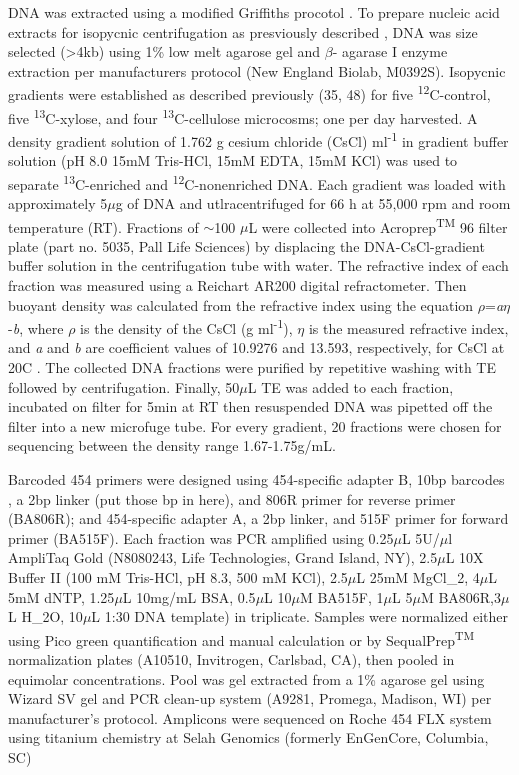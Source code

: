 DNA was extracted using a modified Griffiths procotol \cite{Griffiths_2000}. To prepare nucleic acid extracts for isopycnic centrifugation as presviously described \cite{Buckley_2007}, DNA was size selected (>4kb) using 1\% low melt agarose gel and $\beta$- agarase I enzyme extraction per manufacturers protocol (New England Biolab, M0392S). Isopycnic gradients were established as described previously (35, 48) for five \textsuperscript{12}C-control, five \textsuperscript{13}C-xylose, and four \textsuperscript{13}C-cellulose microcosms; one per day harvested. A density gradient solution of 1.762 g cesium chloride (CsCl) ml\textsuperscript{-1} in gradient buffer solution (pH 8.0 15mM Tris-HCl, 15mM EDTA, 15mM KCl) was used to separate \textsuperscript{13}C-enriched and \textsuperscript{12}C-nonenriched DNA. Each gradient was loaded with approximately 5$\mu$g of DNA and utlracentrifuged for 66 h at 55,000 rpm and room temperature (RT). Fractions of $\sim$100 $\mu$L were collected into Acroprep\textsuperscript{TM} 96 filter plate (part no. 5035, Pall Life Sciences) by displacing the DNA-CsCl-gradient buffer solution in the centrifugation tube with water. The refractive index of each fraction was measured using a Reichart AR200 digital refractometer. Then buoyant density was calculated from the refractive index using the equation $\rho$=\textit{a}$\eta$-\textit{b}, where $\rho$ is the density of the CsCl (g ml\textsuperscript{-1}), $\eta$ is the measured refractive index, and \textit{a} and \textit{b} are coefficient values of 10.9276 and 13.593, respectively, for CsCl at 20{\textdegree}C \cite{9780408708036}. The collected DNA fractions were purified by repetitive washing with TE followed by centrifugation. Finally, 50$\mu$L TE was added to each fraction, incubated on filter for 5min at RT then resuspended DNA was pipetted off the filter into a new microfuge tube. For every gradient, 20 fractions were chosen for sequencing between the density range 1.67-1.75g/mL. 



Barcoded 454 primers were designed using 454-specific adapter B, 10bp barcodes \cite{Hamady_2008}, a 2bp linker (put those bp in here), and 806R primer for reverse primer (BA806R); and 454-specific adapter A, a 2bp linker, and 515F primer for forward primer (BA515F). Each fraction was PCR amplified using 0.25$\mu$L 5U/$\mu$l AmpliTaq Gold (N8080243, Life Technologies, Grand Island, NY), 2.5$\mu$L 10X Buffer II (100 mM Tris-HCl, pH 8.3, 500 mM KCl), 2.5$\mu$L 25mM MgCl_{2}, 4$\mu$L 5mM dNTP, 1.25$\mu$L 10mg/mL BSA, 0.5$\mu$L 10$\mu$M BA515F, 1$\mu$L 5$\mu$M BA806R,3$\mu$L H_{2}O, 10$\mu$L 1:30 DNA template) in triplicate. Samples were normalized either using Pico green quantification and manual calculation or by SequalPrep\textsuperscript{TM} normalization plates (A10510, Invitrogen, Carlsbad, CA), then pooled in equimolar concentrations.  Pool was gel extracted from a 1\% agarose gel using Wizard SV gel and PCR clean-up system (A9281, Promega, Madison, WI) per manufacturer's protocol.  Amplicons were sequenced on Roche 454 FLX system using titanium chemistry at Selah Genomics (formerly EnGenCore, Columbia, SC)  
